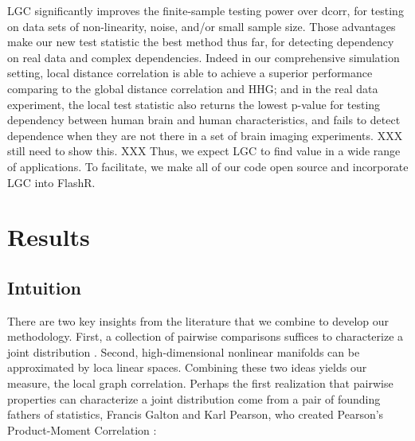 \documentclass[11pt]{article}
\begin{document}
LGC significantly improves the finite-sample testing power over dcorr, for testing on data sets of non-linearity, noise, and/or small sample size. Those advantages make our new test statistic the best method thus far, for detecting dependency on real data and complex dependencies. Indeed in our comprehensive simulation setting, local distance correlation is able to achieve a superior performance comparing to the global distance correlation and HHG; and in the real data experiment, the local test statistic also returns the lowest p-value for testing dependency between human brain and human characteristics,  and fails to detect dependence when they are not there in a set of brain imaging experiments. XXX still need to show this. XXX  Thus, we expect LGC to find value in a wide range of applications.  To facilitate, we make all of our code open source and incorporate LGC into FlashR.




\section{Results}

\subsection{Intuition}

There are two key insights from the literature that we combine to develop our methodology.  First, a collection of pairwise comparisons  suffices to characterize a joint distribution \cite{Maa1996}.  Second, high-dimensional nonlinear manifolds can be approximated by loca linear spaces.  Combining these two ideas yields our measure, the local graph correlation.  Perhaps the first realization that pairwise properties can characterize a joint distribution come from a pair of founding fathers of statistics, Francis Galton and Karl Pearson, who created Pearson's Product-Moment Correlation \cite{Pearson1895}:
\end{document}
